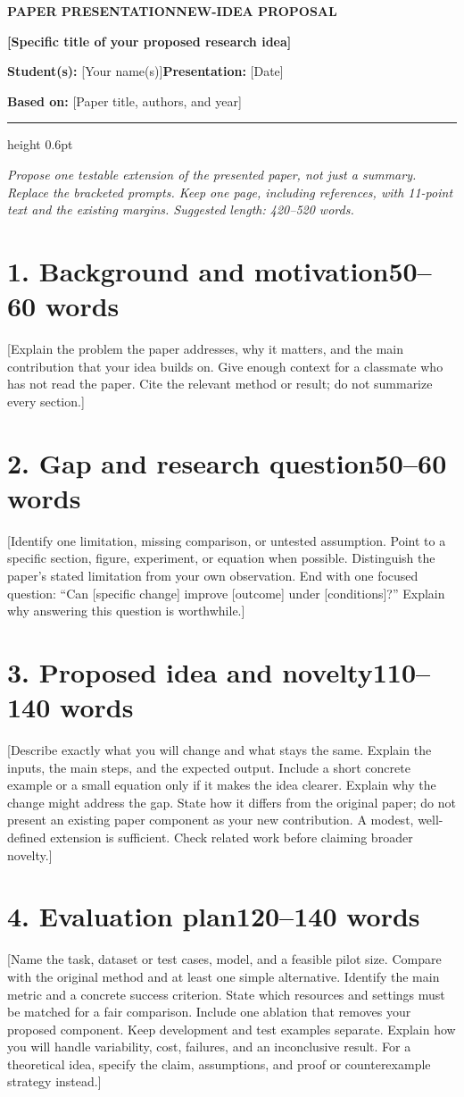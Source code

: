 \documentclass[11pt,letterpaper]{article}
\newcommand{\proposalheader}[4]{%
  {\small\sffamily\bfseries\color{ProposalBlue}
   PAPER PRESENTATION\enspace\textbullet\enspace NEW-IDEA PROPOSAL}\par
  \vspace{3pt}
  {\fontsize{16}{18}\selectfont\bfseries #1\par}
  \vspace{4pt}
  \textbf{Student(s):} #2\hfill\textbf{Presentation:} #3\par
  \textbf{Based on:} #4\par
  \vspace{3pt}
  {\color{ProposalBlue}\hrule height 0.6pt}
  \vspace{4pt}
}
\newcommand{\guide}[1]{{\color{SecondaryText}#1}}
\newcommand{\wordbudget}[1]{{\normalfont\small\color{SecondaryText}\hfill #1 words}}
\begin{document}
\proposalheader{[Specific title of your proposed research idea]}
  {[Your name(s)]}{[Date]}
  {[Paper title, authors, and year]}

\guide{\textit{Propose one testable extension of the presented paper, not just a summary.
Replace the bracketed prompts. Keep one page, including references, with 11-point text
and the existing margins. Suggested length: 420--520 words.}}

\section*{1. Background and motivation\wordbudget{50--60}}
[Explain the problem the paper addresses, why it matters, and the main contribution
that your idea builds on. Give enough context for a classmate who has not read the
paper. Cite the relevant method or result; do not summarize every section.]

\section*{2. Gap and research question\wordbudget{50--60}}
[Identify one limitation, missing comparison, or untested assumption. Point to a
specific section, figure, experiment, or equation when possible. Distinguish the
paper's stated limitation from your own observation. End with one focused question:
``Can [specific change] improve [outcome] under [conditions]?'' Explain why answering
this question is worthwhile.]

\section*{3. Proposed idea and novelty\wordbudget{110--140}}
[Describe exactly what you will change and what stays the same. Explain the inputs,
the main steps, and the expected output. Include a short concrete example or a small
equation only if it makes the idea clearer. Explain why the change might address the
gap. State how it differs from the original paper; do not present an existing paper
component as your new contribution. A modest, well-defined extension is sufficient.
Check related work before claiming broader novelty.]

\section*{4. Evaluation plan\wordbudget{120--140}}
[Name the task, dataset or test cases, model, and a feasible pilot size. Compare with
the original method and at least one simple alternative. Identify the main metric
and a concrete success criterion. State which resources and settings must be matched
for a fair comparison. Include one ablation that removes your proposed component.
Keep development and test examples separate. Explain how you will handle variability,
cost, failures, and an inconclusive result. For a theoretical idea, specify the claim,
assumptions, and proof or counterexample strategy instead.]
\end{document}
